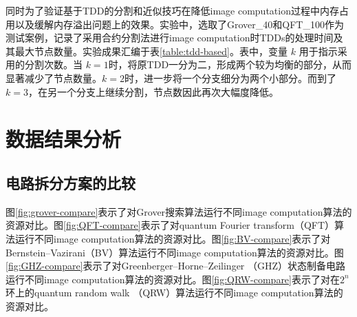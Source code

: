 \begin{table}[]
    \centering
    \caption{TDD拆分与近似的优化方案}

    \label{table:tdd-based}
    \end{table}

    同时为了验证基于TDD的分割和近似技巧在降低image computation过程中内存占用以及缓解内存溢出问题上的效果。实验中，选取了Grover\_40和QFT\_100作为测试案例，记录了采用合约分割法进行image computation时TDDs的处理时间及其最大节点数量。实验成果汇编于表\ref{table:tdd-based}。表中，变量 $k$ 用于指示采用的分割次数。当 $k=1$时，将原TDD一分为二，形成两个较为均衡的部分，从而显著减少了节点数量。$k=2$时，进一步将一个分支细分为两个小部分。而到了 $k=3$，在另一个分支上继续分割，节点数因此再次大幅度降低。
\section{数据结果分析}
\subsection*{电路拆分方案的比较}
图\ref{fig:grover-compare}表示了对Grover搜索算法运行不同image computation算法的资源对比。图\ref{fig:QFT-compare}表示了对quantum Fourier transform（QFT）算法运行不同image computation算法的资源对比。图\ref{fig:BV-compare}表示了对Bernstein–Vazirani（BV）算法运行不同image computation算法的资源对比。图\ref{fig:GHZ-compare}表示了对Greenberger–Horne–Zeilinger （GHZ）状态制备电路运行不同image computation算法的资源对比。图\ref{fig:QRW-compare}表示了对在$2^n$ 环上的quantum random walk （QRW）算法运行不同image computation算法的资源对比。

